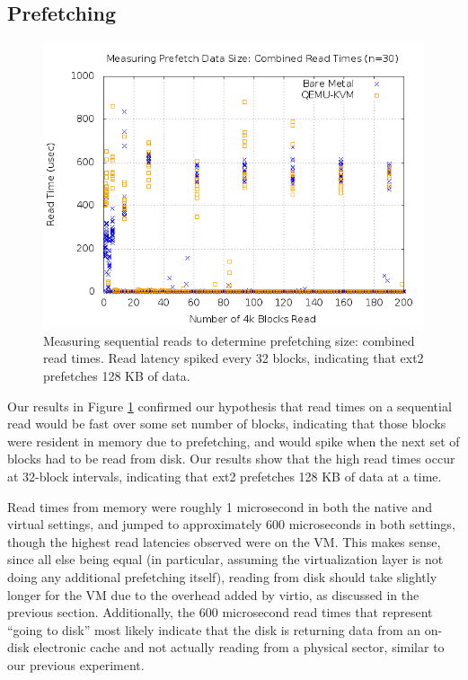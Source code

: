 \documentclass[letterpaper,twocolumn,10pt]{article}
\begin{document}
\subsection{Prefetching}
\begin{figure}[!ht]
\includegraphics[scale=.35]{combined_graphs/prefetch_combined.png}
\caption{Measuring sequential reads to determine prefetching size: combined read times. Read latency spiked every 32 blocks, indicating that ext2 prefetches 128 KB of data.}
\label{fig:prefetch_combined}
\end{figure}
Our results in Figure \ref{fig:prefetch_combined} confirmed our hypothesis that read times on a sequential read would be fast over some set number of blocks, indicating that those blocks were resident in memory due to prefetching, and would spike when the next set of blocks had to be read from disk. 
Our results show that the high read times occur at 32-block intervals, indicating that ext2 prefetches 128 KB of data at a time. 

Read times from memory were roughly 1 microsecond in both the native and virtual settings, and jumped to approximately 600 microseconds in both settings, though the highest read latencies observed were on the VM. 
This makes sense, since all else being equal (in particular, assuming the virtualization layer is not doing any additional prefetching itself), reading from disk should take slightly longer for the VM due to the overhead added by virtio, as discussed in the previous section. Additionally, the 600 microsecond read times that represent ``going to disk'' most likely indicate that the disk is returning data from an on-disk electronic cache and not actually reading from a physical sector, similar to our previous experiment.
\end{document}
